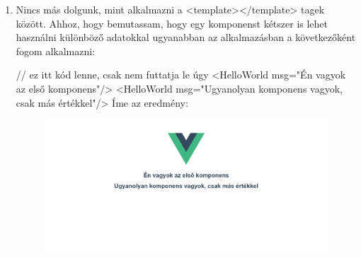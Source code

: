 \begin{enumerate}
 \item Nincs más dolgunk, mint alkalmazni a <template></template> tagek között. Ahhoz, hogy bemutassam, hogy egy komponenst kétszer is lehet használni különböző adatokkal ugyanabban az alkalmazásban a következőként fogom alkalmazni:

// ez itt kód lenne, csak nem futtatja le úgy
<HelloWorld msg="Én vagyok az első komponens"/>
<HelloWorld msg="Ugyanolyan komponens vagyok, csak más értékkel"/>
Íme az eredmény:
\begin{figure}[h!]
	\centering
	\includegraphics[scale=0.25]{images/1617372108829.png}
	\label{fig:ff}
	\end{figure}
\end{enumerate}

